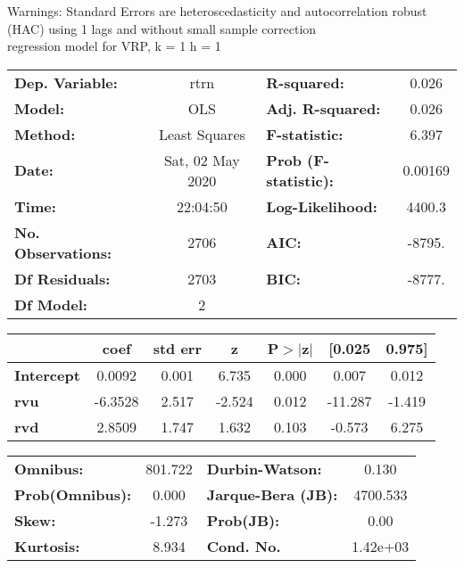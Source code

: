 Warnings: \newline
 [1] Standard Errors are heteroscedasticity and autocorrelation robust (HAC) using 1 lags and without small sample correction\\ 

regression model for VRP, k = 1 h = 1\begin{center}
\begin{tabular}{lclc}
\toprule
\textbf{Dep. Variable:}    &       rtrn       & \textbf{  R-squared:         } &     0.026   \\
\textbf{Model:}            &       OLS        & \textbf{  Adj. R-squared:    } &     0.026   \\
\textbf{Method:}           &  Least Squares   & \textbf{  F-statistic:       } &     6.397   \\
\textbf{Date:}             & Sat, 02 May 2020 & \textbf{  Prob (F-statistic):} &  0.00169    \\
\textbf{Time:}             &     22:04:50     & \textbf{  Log-Likelihood:    } &    4400.3   \\
\textbf{No. Observations:} &        2706      & \textbf{  AIC:               } &    -8795.   \\
\textbf{Df Residuals:}     &        2703      & \textbf{  BIC:               } &    -8777.   \\
\textbf{Df Model:}         &           2      & \textbf{                     } &             \\
\bottomrule
\end{tabular}
\begin{tabular}{lcccccc}
                   & \textbf{coef} & \textbf{std err} & \textbf{z} & \textbf{P$> |$z$|$} & \textbf{[0.025} & \textbf{0.975]}  \\
\midrule
\textbf{Intercept} &       0.0092  &        0.001     &     6.735  &         0.000        &        0.007    &        0.012     \\
\textbf{rvu}       &      -6.3528  &        2.517     &    -2.524  &         0.012        &      -11.287    &       -1.419     \\
\textbf{rvd}       &       2.8509  &        1.747     &     1.632  &         0.103        &       -0.573    &        6.275     \\
\bottomrule
\end{tabular}
\begin{tabular}{lclc}
\textbf{Omnibus:}       & 801.722 & \textbf{  Durbin-Watson:     } &    0.130  \\
\textbf{Prob(Omnibus):} &   0.000 & \textbf{  Jarque-Bera (JB):  } & 4700.533  \\
\textbf{Skew:}          &  -1.273 & \textbf{  Prob(JB):          } &     0.00  \\
\textbf{Kurtosis:}      &   8.934 & \textbf{  Cond. No.          } & 1.42e+03  \\
\bottomrule
\end{tabular}
\end{center}

